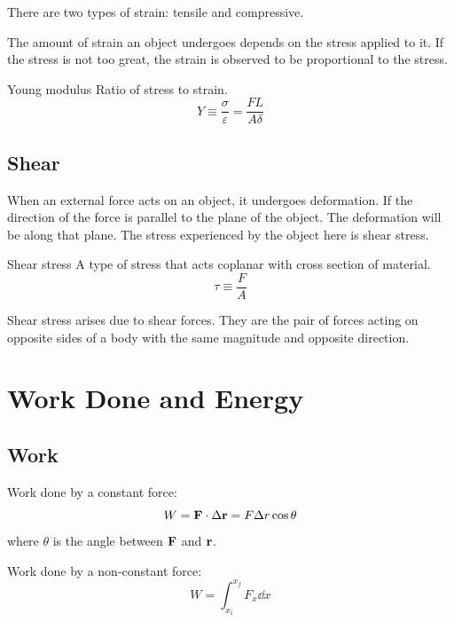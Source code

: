 \begin{remark}
There are two types of strain: tensile and compressive.
\end{remark}

The amount of strain an object undergoes depends on the stress applied to it. If the stress is not too great, the strain is observed to be proportional to the stress.

\begin{defn}{Young modulus}{}
Ratio of stress to strain.
\begin{equation}
Y \equiv \frac{\sigma}{\varepsilon} = \frac{FL}{A\delta}
\end{equation}
\end{defn}

\subsection{Shear}
When an external force acts on an object, it undergoes deformation. If the direction of the force is parallel to the plane of the object. The deformation will be along that plane. The stress experienced by the object here is shear stress.

\begin{defn}{Shear stress}{}
A type of stress that acts coplanar with cross section of material.
\begin{equation}
\tau \equiv \frac{F}{A}
\end{equation}
\end{defn}

Shear stress arises due to shear forces. They are the pair of forces acting on opposite sides of a body with the same magnitude and opposite direction. 
\pagebreak

\section{Work Done and Energy}
\subsection{Work}
Work done by a constant force:
\begin{equation}
W = \vb{F} \cdot \Delta\vb{r} = F\Delta r\cos\theta
\end{equation}
where $\theta$ is the angle between $\vb{F}$ and $\vb{r}$.

Work done by a non-constant force:
\begin{equation}
W = \int_{x_i}^{x_f}F_x \dd{x}
\end{equation}

